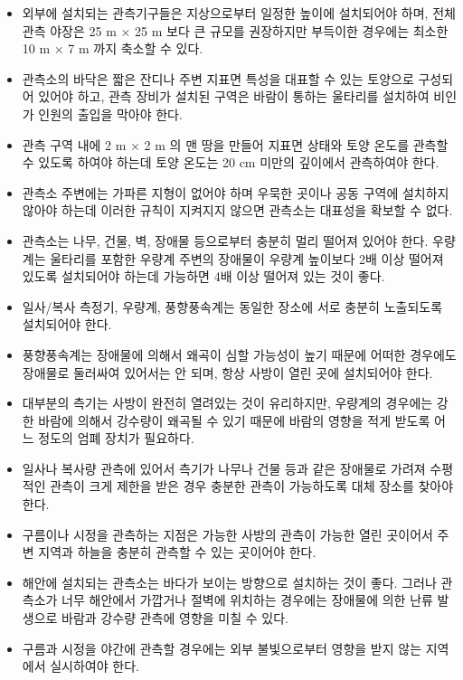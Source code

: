 \begin{itemize}
\begin{itemize}
	\item 외부에 설치되는 관측기구들은 지상으로부터 일정한 높이에 설치되어야 하며, 전체 관측 야장은 25 m × 25 m 보다 큰 규모를 권장하지만 부득이한 경우에는 최소한 10 m × 7 m 까지 축소할 수 있다. 
	\item 관측소의 바닥은 짧은 잔디나 주변 지표면 특성을 대표할 수 있는 토양으로 구성되어 있어야 하고, 관측 장비가 설치된 구역은 바람이 통하는 울타리를 설치하여 비인가 인원의 출입을 막아야 한다. 
	\item 관측 구역 내에 2 m × 2 m 의 맨 땅을 만들어 지표면 상태와 토양 온도를 관측할 수 있도록 하여야 하는데 토양 온도는 20 cm 미만의 깊이에서 관측하여야 한다.
	\item 관측소 주변에는 가파른 지형이 없어야 하며 우묵한 곳이나 공동 구역에 설치하지 않아야 하는데 이러한 규칙이 지켜지지 않으면 관측소는 대표성을 확보할 수 없다.
	\item 관측소는 나무, 건물, 벽, 장애물 등으로부터 충분히 멀리 떨어져 있어야 한다. 우량계는 울타리를 포함한 우량계 주변의 장애물이 우량계 높이보다 2배 이상 떨어져 있도록 설치되어야 하는데 가능하면 4배 이상 떨어져 있는 것이 좋다.
	\item 일사/복사 측정기, 우량계, 풍향풍속계는 동일한 장소에 서로 충분히 노출되도록 설치되어야 한다.
	\item 풍향풍속계는 장애물에 의해서 왜곡이 심할 가능성이 높기 때문에 어떠한 경우에도 장애물로 둘러싸여 있어서는 안 되며, 항상 사방이 열린 곳에 설치되어야 한다.
	\item 대부분의 측기는 사방이 완전히 열려있는 것이 유리하지만, 우량계의 경우에는 강한 바람에 의해서 강수량이 왜곡될 수 있기 때문에 바람의 영향을 적게 받도록 어느 정도의 엄폐 장치가 필요하다.
	\item 일사나 복사량 관측에 있어서 측기가 나무나 건물 등과 같은 장애물로 가려져 수평적인 관측이 크게 제한을 받은 경우 충분한 관측이 가능하도록 대체 장소를 찾아야 한다.
	\item 구름이나 시정을 관측하는 지점은 가능한 사방의 관측이 가능한 열린 곳이어서 주변 지역과 하늘을 충분히 관측할 수 있는 곳이어야 한다.
	\item 해안에 설치되는 관측소는 바다가 보이는 방향으로 설치하는 것이 좋다. 그러나 관측소가 너무 해안에서 가깝거나 절벽에 위치하는 경우에는 장애물에 의한 난류 발생으로 바람과 강수량 관측에 영향을 미칠 수 있다.
	\item 구름과 시정을 야간에 관측할 경우에는 외부 불빛으로부터 영향을 받지 않는 지역에서 실시하여야 한다.
\end{itemize}


\end{itemize}

